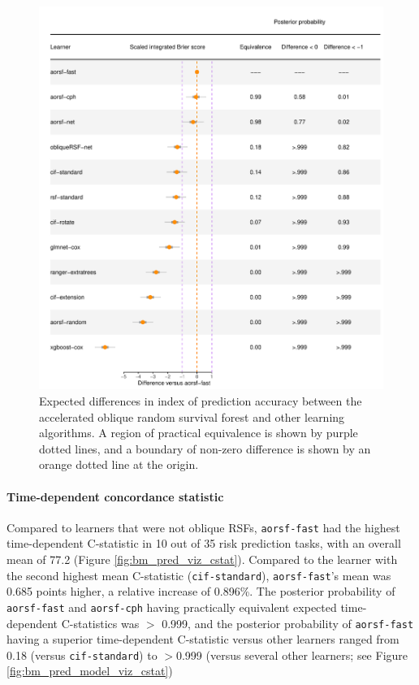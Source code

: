 \documentclass{article}\usepackage[]{graphicx}\usepackage[]{xcolor}
\makeatletter
\def\maxwidth{ %
  \ifdim\Gin@nat@width>\linewidth
    \linewidth
  \else
    \Gin@nat@width
  \fi
}
\newenvironment{knitrout}{}{} %
\makeatother
\begin{document}
\begin{knitrout}
\color{fgcolor}\begin{figure}
\includegraphics[width=\maxwidth]{figure/bm_pred_model_viz_ibs-1} \caption[Expected differences in index of prediction accuracy between the accelerated oblique random survival forest and other learning algorithms]{Expected differences in index of prediction accuracy between the accelerated oblique random survival forest and other learning algorithms. A region of practical equivalence is shown by purple dotted lines, and a boundary of non-zero difference is shown by an orange dotted line at the origin.}\label{fig:bm_pred_model_viz_ibs}
\end{figure}

\end{knitrout}

\paragraph{Time-dependent concordance statistic}




Compared to learners that were not oblique RSFs, \texttt{aorsf-fast} had the highest time-dependent C-statistic in 10 out of 35 risk prediction tasks, with an overall mean of 77.2 (Figure \ref{fig:bm_pred_viz_cstat}). Compared to the learner with the second highest mean C-statistic (\texttt{cif-standard}), \texttt{aorsf-fast}'s mean was 0.685 points higher, a relative increase of 0.896\%. The posterior probability of \texttt{aorsf-fast} and \texttt{aorsf-cph} having practically equivalent expected time-dependent C-statistics was $>$ 0.999, and the posterior probability of \texttt{aorsf-fast} having a superior time-dependent C-statistic versus other learners ranged from 0.18 (versus \texttt{cif-standard}) to $>$0.999 (versus several other learners; see Figure \ref{fig:bm_pred_model_viz_cstat})
\end{document}
